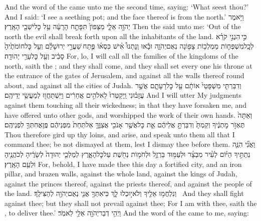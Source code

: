 {And the word of the \lord\space came unto me the second time, saying: ‘What seest thou?’ And I said: ‘I see a seething pot; and the face thereof is from the north.’}
{וַיֹּ֥אמֶר יְהֹוָ֖ה אֵלָ֑י מִצָּפוֹן֙ תִּפָּתַ֣ח הָרָעָ֔ה עַ֥ל כׇּל\maqqaf יֹשְׁבֵ֖י הָאָֽרֶץ׃}
{Then the \lord\space said unto me: ‘Out of the north the evil shall break forth upon all the inhabitants of the land.}
{כִּ֣י \legarmeh  הִנְנִ֣י קֹרֵ֗א לְכׇֽל\maqqaf מִשְׁפְּח֛וֹת מַמְלְכ֥וֹת צָפ֖וֹנָה נְאֻם\maqqaf יְהֹוָ֑ה וּבָ֡אוּ וְֽנָתְנוּ֩ אִ֨ישׁ כִּסְא֜וֹ פֶּ֣תַח \legarmeh  שַׁעֲרֵ֣י יְרוּשָׁלַ֗͏ִם וְעַ֤ל כׇּל\maqqaf חוֹמֹתֶ֙יהָ֙ סָבִ֔יב וְעַ֖ל כׇּל\maqqaf עָרֵ֥י יְהוּדָֽה׃}
{For, lo, I will call all the families of the kingdoms of the north, saith the \lord; and they shall come, and they shall set every one his throne at the entrance of the gates of Jerusalem, and against all the walls thereof round about, and against all the cities of Judah.}
{וְדִבַּרְתִּ֤י מִשְׁפָּטַי֙ אוֹתָ֔ם עַ֖ל כׇּל\maqqaf רָעָתָ֑ם אֲשֶׁ֣ר עֲזָב֗וּנִי וַֽיְקַטְּרוּ֙ לֵאלֹהִ֣ים אֲחֵרִ֔ים וַיִּֽשְׁתַּחֲו֖וּ לְמַעֲשֵׂ֥י יְדֵיהֶֽם׃}
{And I will utter My judgments against them touching all their wickedness; in that they have forsaken me, and have offered unto other gods, and worshipped the work of their own hands.}
{וְאַתָּה֙ תֶּאְזֹ֣ר מׇתְנֶ֔יךָ וְקַמְתָּ֙ וְדִבַּרְתָּ֣ אֲלֵיהֶ֔ם אֵ֛ת כׇּל\maqqaf אֲשֶׁ֥ר אָנֹכִ֖י אֲצַוֶּ֑ךָּ אַל\maqqaf תֵּחַת֙ מִפְּנֵיהֶ֔ם פֶּֽן\maqqaf אֲחִתְּךָ֖ לִפְנֵיהֶֽם׃}
{Thou therefore gird up thy loins, and arise, and speak unto them all that I command thee; be not dismayed at them, lest I dismay thee before them.}
{וַאֲנִ֞י הִנֵּ֧ה נְתַתִּ֣יךָ הַיּ֗וֹם לְעִ֨יר מִבְצָ֜ר וּלְעַמּ֥וּד בַּרְזֶ֛ל וּלְחֹמ֥וֹת נְחֹ֖שֶׁת עַל\maqqaf כׇּל\maqqaf הָאָ֑רֶץ לְמַלְכֵ֤י יְהוּדָה֙ לְשָׂרֶ֔יהָ לְכֹהֲנֶ֖יהָ וּלְעַ֥ם הָאָֽרֶץ׃}
{For, behold, I have made thee this day a fortified city, and an iron pillar, and brazen walls, against the whole land, against the kings of Judah, against the princes thereof, against the priests thereof, and against the people of the land.}
{וְנִלְחֲמ֥וּ אֵלֶ֖יךָ וְלֹא\maqqaf י֣וּכְלוּ לָ֑ךְ כִּי\maqqaf אִתְּךָ֥ אֲנִ֛י נְאֻם\maqqaf יְהֹוָ֖ה לְהַצִּילֶֽךָ׃ \petucha }
{And they shall fight against thee; but they shall not prevail against thee; For I am with thee, saith the \lord, to deliver thee.’}
\newperek
{}
{וַיְהִ֥י דְבַר\maqqaf יְהֹוָ֖ה אֵלַ֥י לֵאמֹֽר׃}
{And the word of the \lord\space came to me, saying:}
